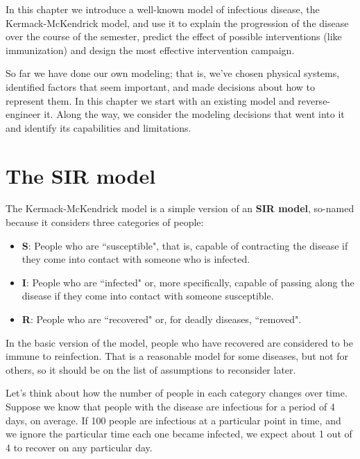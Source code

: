 \documentclass[12pt]{book}
\theoremstyle{exercise}
\begin{document}
In this chapter we introduce a well-known model of infectious disease, the Kermack-McKendrick model, and use it to explain the progression of the disease over the course of the semester, predict the effect of possible interventions (like immunization) and design the most effective intervention campaign.

So far we have done our own modeling; that is, we've chosen physical systems, identified factors that seem important, and made decisions about how to represent them.  In this chapter we start with an existing model and reverse-engineer it.  Along the way, we consider the modeling decisions that went into it and identify its capabilities and limitations.

\section{The SIR model}

The Kermack-McKendrick model is a simple version of an {\bf SIR model}, so-named because it considers three categories of people:

\begin{itemize}

\item {\bf S}: People who are ``susceptible", that is, capable of contracting the disease if they come into contact with someone who is infected.

\item {\bf I}: People who are ``infected" or, more specifically, capable of passing along the disease if they come into contact with someone susceptible.

\item {\bf R}: People who are ``recovered" or, for deadly diseases, ``removed".

\end{itemize}
  
In the basic version of the model, people who have recovered are considered to be immune to reinfection.  That is a reasonable model for some diseases, but not for others, so it should be on the list of assumptions to reconsider later.

Let's think about how the number of people in each category changes over time.  Suppose we know that people with the disease are infectious for a period of 4 days, on average.  If 100 people are infectious at a particular point in time, and we ignore the particular time each one became infected, we expect about 1 out of 4 to recover on any particular day.
\end{document}

